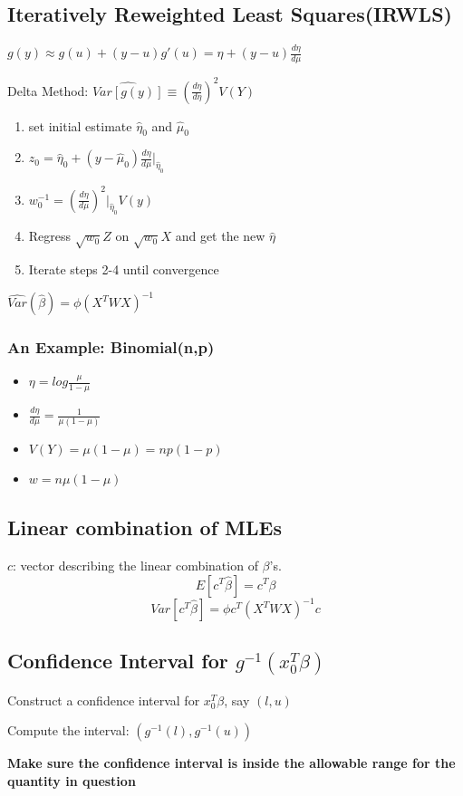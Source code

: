 \documentclass[10pt,landscape, fleqn]{article}
\begin{document}
\begin{multicols}{3}
			\subsection{Iteratively Reweighted Least Squares(IRWLS)}
				$g(y) \approx g(u) + (y-u)g'(u) = \eta + (y - u)\frac{d\eta}{d\mu}$ \par 
				Delta Method: $\widehat{Var[g(y)]} \equiv \left(\frac{d\eta}{d\eta}\right)^2V(Y)$
				\begin{enumerate}
					\item set initial estimate $\hat{\eta}_0$ and $\hat{\mu}_0$
					\item $z_0 = \hat{\eta}_0 + (y-\hat{\mu}_0)\frac{d\eta}{d\mu}|_{\hat{\eta}_0}$
					\item $w_0^{-1} = \left( \frac{d\eta}{d\mu} \right)^2|_{\hat{\eta}_0}V(y)$
					\item Regress $\sqrt{w_0}Z$ on $\sqrt{w_0}X$ and get the new $\hat{\eta}$
					\item Iterate steps 2-4 until convergence
				\end{enumerate}
				$\widehat{Var}(\hat{\beta}) = \phi(X^TWX)^{-1}$
				\subsubsection{An Example: Binomial(n,p)}
					\begin{itemize}
						\item $\eta = log\frac{\mu}{1-\mu}$
						\item $\frac{d\eta}{d\mu} = \frac{1}{\mu(1-\mu)}$
						\item $V(Y) = \mu(1-\mu) = np(1-p)$
						\item $w = n\mu(1-\mu)$
					\end{itemize}
			\subsection{Linear combination of MLEs}
				$c$: vector describing the linear combination of $\beta$'s.
				\[E[c^T\hat{\beta}] = c^T\beta \]
				\[Var[c^T\hat{\beta}] = \phi c^T(X^TWX)^{-1}c \]
			\subsection{Confidence Interval for $g^{-1}(x_0^T\beta)$}
				Construct a confidence interval for $x_0^T\beta$, say $(l,u)$\par 
				Compute the interval: $(g^{-1}(l), g^{-1}(u))$ \par 
				\textbf{Make sure the confidence interval is inside the allowable range for the quantity in question}

\end{multicols}
\end{document}
